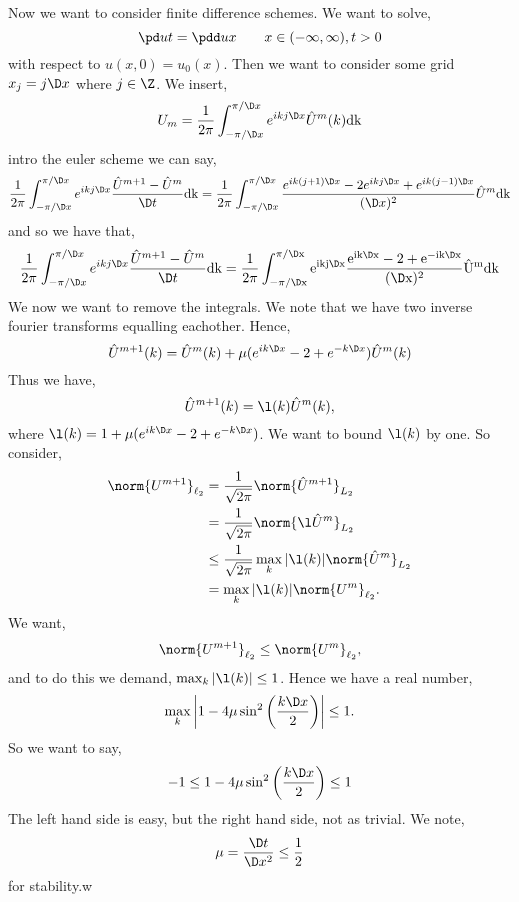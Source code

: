 \noindent
Now we want to consider finite difference schemes. We want to solve,
$$ \pd u t = \pdd u x \qquad x \in (-\infty, \infty), t > 0$$
with respect to $u(x, 0) = u_0(x)$. Then we want to consider some grid $x_j = j\D x$ where $j \in \Z$. We insert,
$$ U_m = \frac{1}{2\pi}\int_{-\pi/\D x}^{\pi/\D x} e^{ikj \D x} \hat U^m (k)\rm d k $$
intro the euler scheme we can say,
\begin{align*}
  \frac{1}{2\pi} \int_{-\pi / \D x}^{\pi / \D x} e^{ikj \D x} \frac{\hat U^{m+1} - \hat U^m}{\D t} \rm d k &= \frac{1}{2\pi} \int_{-\pi / \D x}^{\pi / \D x} \frac{e^{ik(j+1)\D x} - 2 e^{ikj\D x} + e^{ik(j-1)\D x}}{(\D x)^2} \hat U^m \rm d k\\
\end{align*}
and so we have that,
$$ \frac{1}{2\pi} \int_{-\pi / \D x}^{\pi / \D x} e^{ikj \D x} \frac{\hat U^{m+1} - \hat U^m}{\D t} \rm d k = \frac{1}{2\pi} \int_{-\pi / \D x}^{\pi / \D x} e^{ikj \D x} \frac{e^{ik\D x} - 2 + e^{-ik\D x}}{(\D x)^2} \hat U^m \rm d k $$
We now we want to remove the integrals. We note that we have two inverse fourier transforms equalling eachother. Hence,
$$ \hat U^{m+1}(k) = \hat U^m(k) + \mu (e^{ik\D x} - 2 + e^{-k\D x})\hat U^m(k) $$
Thus we have,
$$ \hat U^{m+1}(k) = \l(k)\hat U^m(k), $$
where $\l(k) = 1 + \mu (e^{ik\D x} - 2 + e^{-k\D x})$. We want to bound $\l(k)$ by one. So consider,
\begin{align*}
  \norm{U^{m+1}}_{\ell_2} &= \frac{1}{\sqrt{2\pi}}\norm{\hat U^{m+1}}_{L_2} \\
  &= \frac{1}{\sqrt{2\pi}}\norm{\l \hat U^m}_{L_2} \\
  &\le \frac{1}{\sqrt{2\pi}} \max_k |\l(k)| \norm{\hat U^m}_{L_2} \\
  &= \max_k |\l(k)| \norm{U^m}_{\ell_2}.
\end{align*}
We want,
$$ \norm{U^{m+1}}_{\ell_2} \le \norm{U^m}_{\ell_2}, $$
and to do this we demand, $\max_k |\l(k)| \le 1$. Hence we have a real number,
$$ \max_k \left| 1 - 4\mu \sin^2 \left( \frac{k\D x}{2} \right) \right| \le 1.$$
So we want to say,
$$ -1 \le 1 - 4 \mu \sin^2 \left( \frac{k \D x}{2} \right) \le 1 $$
The left hand side is easy, but the right hand side, not as trivial. We note,
$$ \mu = \frac{\D t}{\D x^2} \le \frac{1}{2} $$
for stability.w